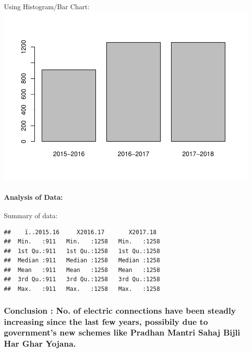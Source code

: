 \documentclass[]{article}
\let\oldparagraph\paragraph
\renewcommand{\paragraph}[1]{\oldparagraph{#1}\mbox{}}
\begin{document}
Using Histogram/Bar Chart:
\includegraphics{Report_files/figure-latex/unnamed-chunk-15-1.pdf}

\paragraph{Analysis of Data:}\label{analysis-of-data-3}

Summary of data:

\begin{verbatim}
##    ï..2015.16     X2016.17       X2017.18   
##  Min.   :911   Min.   :1258   Min.   :1258  
##  1st Qu.:911   1st Qu.:1258   1st Qu.:1258  
##  Median :911   Median :1258   Median :1258  
##  Mean   :911   Mean   :1258   Mean   :1258  
##  3rd Qu.:911   3rd Qu.:1258   3rd Qu.:1258  
##  Max.   :911   Max.   :1258   Max.   :1258
\end{verbatim}

\subsubsection{\texorpdfstring{\textbf{Conclusion} : No. of electric
connections have been steadly increasing since the last few years,
possibily due to government's new schemes like Pradhan Mantri Sahaj
Bijli Har Ghar
Yojana.}{Conclusion : No. of electric connections have been steadly increasing since the last few years, possibily due to government's new schemes like Pradhan Mantri Sahaj Bijli Har Ghar Yojana.}}\label{conclusion-no.-of-electric-connections-have-been-steadly-increasing-since-the-last-few-years-possibily-due-to-governments-new-schemes-like-pradhan-mantri-sahaj-bijli-har-ghar-yojana.}
\end{document}
